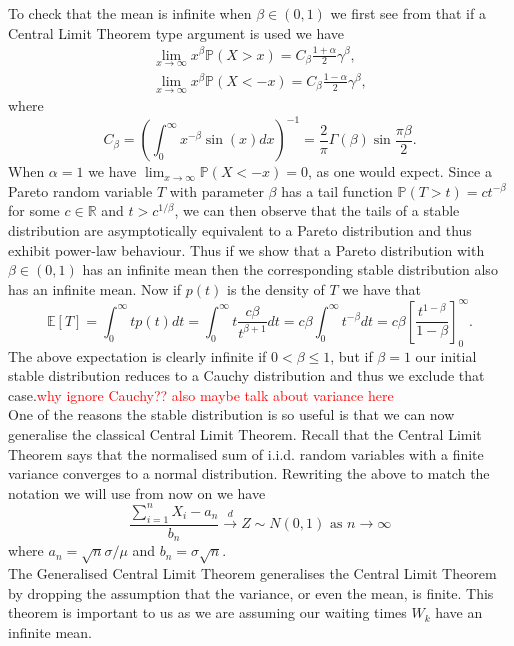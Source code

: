 \documentclass[honours,12pt]{UNSWthesis}
\newcommand{\R}{\mathbb{R}}
\newcommand{\PP}{\mathbb{P}}
\newcommand{\E}{\mathbb{E}}
\newcommand{\1}{\mathbf 1}
\numberwithin{equation}{section}
\theoremstyle{definition}
\theoremstyle{remark}
\begin{document}
\noindent To check that the mean is infinite when $\beta \in (0,1)$ we first see from \cite{JanickiWeron1994} that if a Central Limit Theorem type argument is used we have
\begin{align}
\lim_{x\to\infty} x^\beta\PP(X>x)=C_\beta\frac{1+\alpha}{2}\gamma^\beta,\\
\lim_{x\to\infty} x^\beta\PP(X<-x)=C_\beta\frac{1-\alpha}{2}\gamma^\beta,
\end{align}
\noindent where
\[
	C_\beta=\left(\int^\infty_0 x^{-\beta} \sin(x) dx  \right)^{-1}=\frac{2}{\pi}\Gamma(\beta)\sin\frac{\pi\beta}{2}.
\]
\noindent When $\alpha=1$ we have $\lim_{x\to\infty}\PP(X<-x)=0$, as one would expect. Since a Pareto random variable $T$ with parameter $\beta$ has a tail function $\PP(T>t)=ct^{-\beta}$ for some $c\in \R$ and $t>c^{1/\beta}$, we can then observe that the tails of a stable distribution are asymptotically equivalent to a Pareto distribution and thus exhibit power-law behaviour. Thus if we show that a Pareto distribution with $\beta \in (0,1)$ has an infinite mean then the corresponding stable distribution also has an infinite mean. Now if $p(t)$ is the density of $T$ we have that 
\[
	\E[T]=\int^\infty_0 tp(t)dt = \int^\infty_0 t\frac{c\beta}{t^{\beta+1}}dt = c\beta\int^\infty_0 t^{-\beta}dt = c\beta \left[\frac{t^{1-\beta}}{1-\beta}\right]^\infty_0.
\]
The above expectation is clearly infinite if $0<\beta\leq1$, but if $\beta=1$ our initial stable distribution reduces to a Cauchy distribution and thus we exclude that case.\textcolor{red}{why ignore Cauchy?? also maybe talk about variance here}\\

One of the reasons the stable distribution is so useful is that we can now generalise the classical Central Limit Theorem. Recall that the Central Limit Theorem says that the normalised sum of i.i.d. random variables with a finite variance converges to a normal distribution. Rewriting the above to match the notation we will use from now on we have
\[
	\frac{\sum^n_{i=1}X_i-a_n}{b_n} \overset{d}{\to}Z \sim N(0,1) \textrm{ as $n\to\infty$}
\]
where $a_n=\sqrt{n}\sigma/\mu$ and $b_n=\sigma\sqrt{n}.$\\

\noindent The Generalised Central Limit Theorem generalises the Central Limit Theorem by dropping the assumption that the variance, or even the mean, is finite. This theorem is important to us as we are assuming our waiting times $W_k$ have an infinite mean.\\
\end{document}
